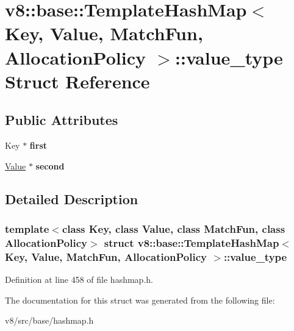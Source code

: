 \hypertarget{structv8_1_1base_1_1TemplateHashMap_1_1value__type}{}\section{v8\+:\+:base\+:\+:Template\+Hash\+Map$<$ Key, Value, Match\+Fun, Allocation\+Policy $>$\+:\+:value\+\_\+type Struct Reference}
\label{structv8_1_1base_1_1TemplateHashMap_1_1value__type}
\subsection*{Public Attributes}
\begin{DoxyCompactItemize}
\item 
\mbox{\label{structv8_1_1base_1_1TemplateHashMap_1_1value__type_a9aa10de3c46573926101e8a369c4f127}} 
Key $\ast$ {\bfseries first}
\item 
\mbox{\label{structv8_1_1base_1_1TemplateHashMap_1_1value__type_a7844cf7b4a52dfc789a12544eab4fa7d}} 
\mbox{\hyperlink{classv8_1_1Value}{Value}} $\ast$ {\bfseries second}
\end{DoxyCompactItemize}


\subsection{Detailed Description}
\subsubsection*{template$<$class Key, class Value, class Match\+Fun, class Allocation\+Policy$>$\newline
struct v8\+::base\+::\+Template\+Hash\+Map$<$ Key, Value, Match\+Fun, Allocation\+Policy $>$\+::value\+\_\+type}



Definition at line 458 of file hashmap.\+h.



The documentation for this struct was generated from the following file\+:\begin{DoxyCompactItemize}
\item 
v8/src/base/hashmap.\+h\end{DoxyCompactItemize}
